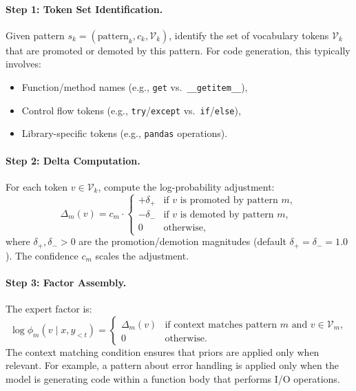 \documentclass[11pt]{article}
\begin{document}
\paragraph{Step 1: Token Set Identification.}
Given pattern $s_k = (\text{pattern}_k, c_k, \mathcal{V}_k)$, identify the set
of vocabulary tokens $\mathcal{V}_k$ that are promoted or demoted by this
pattern. For code generation, this typically involves:
\begin{itemize}[leftmargin=1.5em]
    \item Function/method names (e.g., \texttt{get} vs.\ \texttt{\_\_getitem\_\_}),
    \item Control flow tokens (e.g., \texttt{try}/\texttt{except} vs.\ \texttt{if}/\texttt{else}),
    \item Library-specific tokens (e.g., \texttt{pandas} operations).
\end{itemize}

\paragraph{Step 2: Delta Computation.}
For each token $v \in \mathcal{V}_k$, compute the log-probability adjustment:
\begin{equation}
    \Delta_m(v) = c_m \cdot \begin{cases}
        +\delta_+ & \text{if } v \text{ is promoted by pattern } m, \\
        -\delta_- & \text{if } v \text{ is demoted by pattern } m, \\
        0 & \text{otherwise},
    \end{cases}
\end{equation}
where $\delta_+, \delta_- > 0$ are the promotion/demotion magnitudes (default
$\delta_+ = \delta_- = 1.0$). The confidence $c_m$ scales the adjustment.

\paragraph{Step 3: Factor Assembly.}
The expert factor is:
\begin{equation}
    \log \phi_m(v \mid x, y_{<t}) = \begin{cases}
        \Delta_m(v) & \text{if context matches pattern } m \text{ and } v \in \mathcal{V}_m, \\
        0 & \text{otherwise}.
    \end{cases}
\end{equation}
The context matching condition ensures that priors are applied only when
relevant. For example, a pattern about error handling is applied only when the
model is generating code within a function body that performs I/O operations.
\end{document}
